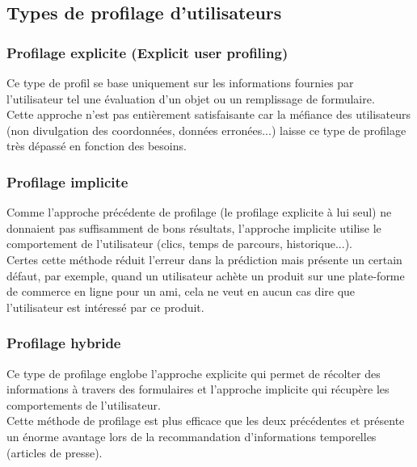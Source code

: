 \subsection{Types de profilage d'utilisateurs}
\subsubsection{Profilage explicite (Explicit user profiling)}
Ce type de profil se base uniquement sur les informations fournies par l'utilisateur tel une évaluation d'un objet ou un remplissage de formulaire.\\
Cette approche n'est pas entièrement satisfaisante car la méfiance des utilisateurs (non divulgation des coordonnées, données erronées...) laisse ce type de profilage très dépassé en fonction des besoins.

\subsubsection{Profilage implicite}
Comme l'approche précédente de profilage (le profilage explicite à lui seul) ne donnaient pas suffisamment de bons résultats, l'approche implicite utilise le comportement de l'utilisateur (clics, temps de parcours, historique...).\\
Certes cette méthode réduit l'erreur dans la prédiction mais présente un certain défaut, par exemple, quand un utilisateur achète un produit sur une plate-forme de commerce en ligne pour un ami, cela ne veut en aucun cas dire que l'utilisateur est intéressé par ce produit.

\subsubsection{Profilage hybride}
Ce type de profilage englobe l'approche explicite qui permet de récolter des informations à travers des formulaires et l'approche implicite qui récupère les comportements de l'utilisateur.\\ 
Cette méthode de profilage est plus efficace que les deux précédentes et présente un énorme avantage lors de la recommandation d'informations temporelles (articles de presse).

